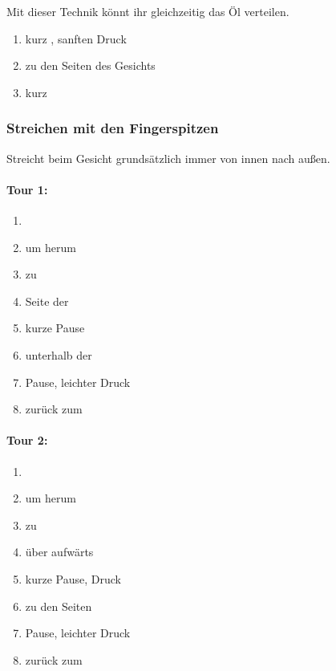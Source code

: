 Mit dieser Technik könnt ihr gleichzeitig das Öl verteilen.

\begin{enumerate}
  \item kurz , sanften Druck
  \item {} zu den Seiten des Gesichts
  \item kurz 
\end{enumerate}

\newpage
\subsubsection{Streichen mit den Fingerspitzen}

Streicht beim Gesicht grundsätzlich immer von innen nach außen.

\begin{multicols}{2}

\begin{oframed}
\paragraph{Tour 1:}
\begin{enumerate}
  \item {}
  \item um  herum
  \item zu 
  \item Seite der 
  \item {} kurze Pause
  \item unterhalb der 
  \item {} Pause, leichter Druck
  \item zurück zum 
\end{enumerate}
\end{oframed}

\columnbreak

\begin{oframed}
\paragraph{Tour 2:}
\begin{enumerate}
  \item {}
  \item um  herum
  \item zu 
  \item über  aufwärts
  \item {} kurze Pause, Druck
  \item {} zu den Seiten
  \item {} Pause, leichter Druck
  \item zurück zum 
\end{enumerate}
\end{oframed}

\end{multicols}


